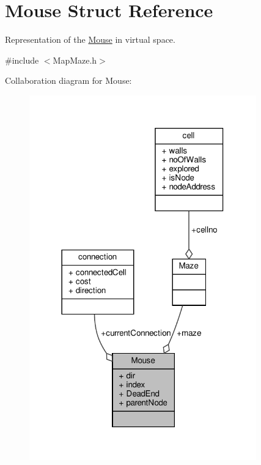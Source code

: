 \hypertarget{structMouse}{}\section{Mouse Struct Reference}
\label{structMouse}


Representation of the \hyperlink{structMouse}{Mouse} in virtual space.  




{\ttfamily \#include $<$Map\+Maze.\+h$>$}



Collaboration diagram for Mouse\+:
\nopagebreak
\begin{figure}[H]
\begin{center}
\leavevmode
\includegraphics[width=278pt]{structMouse__coll__graph}
\end{center}
\end{figure}
